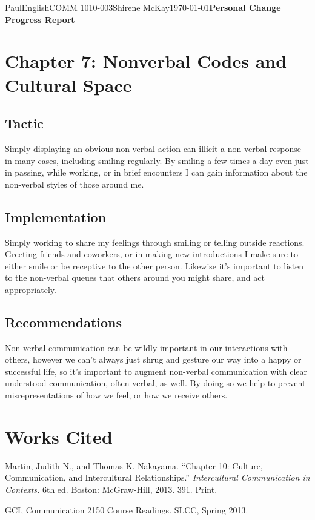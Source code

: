 \documentclass[12pt,letterpaper]{article}
\begin{document}
\begin{mla}{Paul}{English}{COMM 1010-003}{Shirene
    McKay}{\today}{\textbf{Personal Change Progress Report}}
\section{Chapter 7: Nonverbal Codes and Cultural Space}
\subsection{Tactic}
Simply displaying an obvious non-verbal action can illicit a
non-verbal response in many cases, including smiling regularly. By
smiling a few times a day even just in passing, while 
working, or in brief encounters I can gain information about the
non-verbal styles of those around me.

\subsection{Implementation}
Simply working to share my feelings through smiling or telling outside
reactions. Greeting friends and coworkers, or in making new
introductions I make sure to either smile or be receptive to the other
person. Likewise it's important to listen to the non-verbal queues
that others around you might share, and act appropriately.

\subsection{Recommendations}
Non-verbal communication can be wildly important in our interactions
with others, however we can't always just shrug and gesture our way
into a happy or successful life, so it's important to augment
non-verbal communication with clear understood communication, often
verbal, as well. By doing so we help to prevent misrepresentations of
how we feel, or how we receive others.

\pagebreak
\section{Works Cited}

\bibent
Martin, Judith N., and Thomas K. Nakayama. ``Chapter 10: Culture,
Communication, and Intercultural Relationships.''
\textit{Intercultural Communication in Contexts.} 6th ed. Boston: 
McGraw-Hill, 2013. 391. Print.

\bibent
GCI, Communication 2150 Course Readings. SLCC, Spring 2013.

\end{mla}
\end{document}
